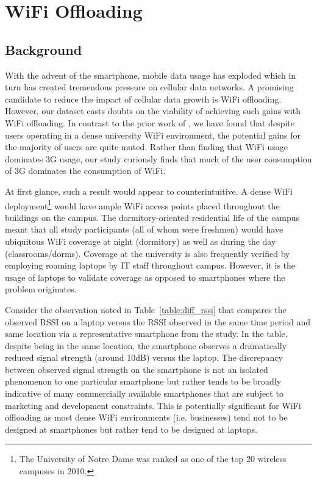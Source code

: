 \chapter{WiFi Offloading}
\label{chap:offloading}

\section{Background}\label{background}
With the advent of the smartphone, mobile data usage has exploded which in turn has created tremendous pressure on cellular data networks.  A promising candidate to reduce the impact of cellular data growth is WiFi offloading. However, our dataset casts doubts on the viability of achieving such 
gains with WiFi offloading. In contrast to the prior work of \cite{lee2010mobile}, we have found that despite users operating in a dense university WiFi environment, the potential gains for the majority of users are quite muted. Rather than finding that WiFi usage dominates 3G usage, our study curiously finds that much of the user consumption of 3G dominates the consumption of WiFi. 

At first glance, such a result would appear to counterintuitive. A dense WiFi deployment\footnote{The
University of Notre Dame was ranked as one of the top 20 wireless campuses in 2010.} would have ample
WiFi access points placed throughout the buildings on the campus. The dormitory-oriented residential
life of the campus meant that all study participants (all of whom were freshmen) would have ubiquitous
WiFi coverage at night (dormitory) as well as during the day (classrooms/dorms). Coverage at the
university is also frequently verified by employing roaming laptops by IT staff throughout campus. However, it is the usage of laptops to validate coverage as opposed to smartphones where the problem
originates.

Consider the observation noted in Table~\ref{table:diff_rssi} that compares the observed RSSI on 
a laptop versus the RSSI observed in the same time period and same location via a representative smartphone 
from the study. In the table, despite being in the same location, the smartphone observes a dramatically
reduced signal strength (around 10dB) versus the laptop. The discrepancy between observed signal strength on the smartphone
is not an isolated phenomenon to one particular smartphone but rather tends to be broadly indicative of many
commercially available smartphones that are subject to marketing and development constraints. This is 
potentially significant for WiFi offloading as most dense WiFi environments (i.e. businesses) tend not 
to be designed at smartphones but rather tend to be designed at laptops.  

